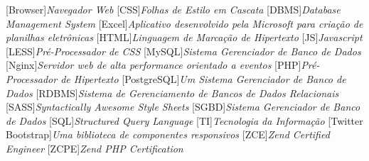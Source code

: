 
[Browser]{\textit{Navegador Web}}
[CSS]{\textit{Folhas de Estilo em Cascata}}
[DBMS]{\textit{Database Management System}}
[Excel]{\textit{Aplicativo desenvolvido pela Microsoft para
criação de planilhas eletrônicas}}
[HTML]{\textit{Linguagem de Marcação de Hipertexto}}
[JS]{\textit{Javascript}}
[LESS]{\textit{Pré-Processador de CSS}}
[MySQL]{\textit{Sistema Gerenciador de Banco de Dados}}
[Nginx]{\textit{Servidor web de alta performance orientado a
eventos}}
[PHP]{\textit{Pré-Processador de Hipertexto}}
[PostgreSQL]{\textit{Um Sistema Gerenciador de Banco de Dados}}
[RDBMS]{\textit{Sistema de Gerenciamento de Bancos de Dados
Relacionais}}
[SASS]{\textit{Syntactically Awesome Style Sheets}}
[SGBD]{\textit{Sistema Gerenciador de Banco de Dados}}
[SQL]{\textit{Structured Query Language}}
[TI]{\textit{Tecnologia da Informação}}
[Twitter Bootstrap]{\textit{Uma biblioteca de
componentes responsivos}}
[ZCE]{\textit{Zend Certified Engineer}}
[ZCPE]{\textit{Zend PHP Certification}}